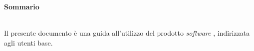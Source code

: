 \noindent\begin{Large}\textbf{Sommario}\end{Large}\\
\noindent Il presente documento è una guida all'utilizzo del prodotto \textit{software} \progetto{}, indirizzata agli utenti base.

